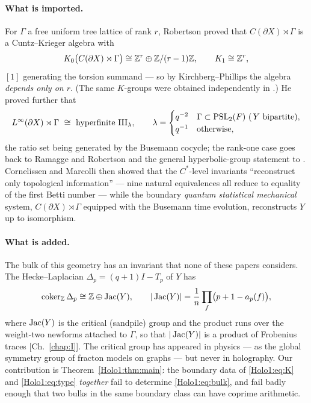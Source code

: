 \paragraph{What is imported.}
For $\Gamma$ a free uniform tree lattice of rank $r$, Robertson proved
\cite[Thm.~1]{Rob05} that $C(\partial X)\rtimes\Gamma$ is a Cuntz--Krieger algebra with
\begin{equation}\label{Holo1:eq:K}
K_0\bigl(C(\partial X)\rtimes\Gamma\bigr)\cong\mathbb{Z}^{r}\oplus\mathbb{Z}/(r-1)\mathbb{Z},
\qquad K_1\cong\mathbb{Z}^{r},
\end{equation}
$[1]$ generating the torsion summand --- so by Kirchberg--Phillips the algebra
\emph{depends only on $r$}. (The same $K$-groups were obtained independently in
\cite{CLM08}.) He proved further \cite[Thm.~2, Cor.~1]{Rob05} that
\begin{equation}\label{Holo1:eq:type}
L^\infty(\partial X)\rtimes\Gamma\ \cong\ \text{hyperfinite }\III_\lambda,\qquad
\lambda=\begin{cases}q^{-2}&\Gamma\subset\mathrm{PSL}_2(F)\ (\,Y\ \text{bipartite}),\\
q^{-1}&\text{otherwise},\end{cases}
\end{equation}
the ratio set being generated by the Busemann cocycle; the rank-one case goes back to
Ramagge and Robertson \cite{RR97} and the general hyperbolic-group statement to
\cite{INO08,Bowen14}. Cornelissen and Marcolli \cite{CM13} then showed that the
$C^*$-level invariants ``reconstruct only topological information'' --- nine natural
equivalences all reduce to equality of the first Betti number --- while the boundary
\emph{quantum statistical mechanical} system, $C(\partial X)\rtimes\Gamma$ equipped with
the Busemann time evolution, reconstructs $Y$ up to isomorphism.

\paragraph{What is added.}
The bulk of this geometry has an invariant that none of these papers considers. The
Hecke--Laplacian $\Delta_p=(q{+}1)I-T_p$ of $Y$ has
\begin{equation}\label{Holo1:eq:bulk}
\operatorname{coker}_{\mathbb{Z}}\Delta_p\cong\mathbb{Z}\oplus\operatorname{Jac}(Y),
\qquad
|\operatorname{Jac}(Y)|=\frac1n\prod_f\bigl(p+1-a_p(f)\bigr),
\end{equation}
where $\operatorname{Jac}(Y)$ is the critical (sandpile) group \cite{Biggs,BHN} and the product runs over
the weight-two newforms attached to $\Gamma$, so that $|\operatorname{Jac}(Y)|$ is a product of Frobenius
traces [Ch.~\ref{chap:I}]. The critical group has appeared in physics --- as the global
symmetry group of fracton models on graphs \cite{GLS22,GLSS23} --- but never in holography.
Our contribution is Theorem~\ref{Holo1:thm:main}: the boundary data of \eqref{Holo1:eq:K} and
\eqref{Holo1:eq:type} \emph{together} fail to determine \eqref{Holo1:eq:bulk}, and fail badly enough
that two bulks in the same boundary class can have coprime arithmetic.

